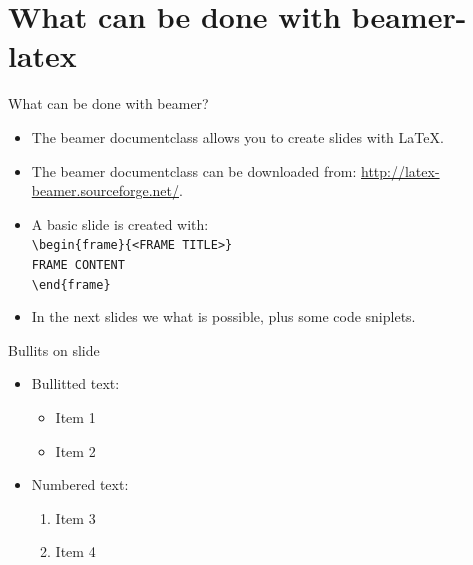\documentclass[t,11pt]{beamer}
\begin{document}
\section{What can be done with beamer-latex}

\begin{frame}[fragile]{What can be done with beamer?}
\begin{itemize}
\item	The beamer documentclass allows you to create slides
		with \LaTeX.
\item	The beamer documentclass can be downloaded from:
		\url{http://latex-beamer.sourceforge.net/}.
\item	A basic slide is created with:\\
\vspace{0.1\baselineskip}
\verb|\begin{frame}{<FRAME TITLE>}|\\
\verb|FRAME CONTENT|\\
\verb|\end{frame}|\\
\vspace{0.5\baselineskip}
\item	In the next slides we what is possible, plus some
		code sniplets.
\end{itemize}
\end{frame}


\begin{frame}{Bullits on slide}
\begin{itemize}
\item \alert{Bullitted text:}
  \begin{itemize}
  \item Item 1
  \item Item 2
  \end{itemize}
\vspace{.5\baselineskip}

\item \alert{Numbered text:}
  \begin{enumerate}
  \item Item 3
  \item Item 4
  \end{enumerate}
\end{itemize}
\end{frame}
\end{document}
